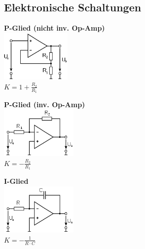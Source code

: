 	
	
	
	
	
	
	\subsection {Elektronische Schaltungen}
		\begin{minipage}{7cm}
			\textbf{P-Glied (nicht inv. Op-Amp)}\\
			\includegraphics[height=2.5cm]{./bilder/OP-Amp.png} \\
			$K = 1 + \frac{R_2}{R_1}$
		\end{minipage}
		\begin{minipage}{6cm}
			\textbf{P-Glied (inv. Op-Amp)} \\ 
			\includegraphics[height=2.5cm]{./bilder/OP-InvAmp.png} \\
			$K=-\frac{R_2}{R_1}$
		\end{minipage}
		\begin{minipage}{6cm}
			\textbf{I-Glied} \\ 
			\includegraphics[height=2.5cm]{./bilder/OP-Integrator.png}\\
			$K = - \frac{1}{R \cdot C}$
		\end{minipage}  




